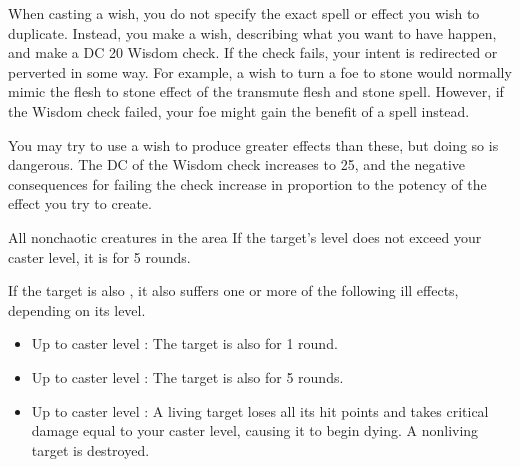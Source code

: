 \par When casting a wish, you do not specify the exact spell or effect you wish to duplicate. Instead, you make a wish, describing what you want to have happen, and make a DC 20 Wisdom check. If the check fails, your intent is redirected or perverted in some way. For example, a wish to turn a foe to stone would normally mimic the flesh to stone effect of the transmute flesh and stone spell. However, if the Wisdom check failed, your foe might gain the benefit of a  spell instead.
\par You may try to use a wish to produce greater effects than these, but doing so is dangerous. The DC of the Wisdom check increases to 25, and the negative consequences for failing the check increase in proportion to the potency of the effect you try to create.

\begin{spellheader}
\end{spellheader}
\begin{spelleffects}
    \begin{spelltargets}{All nonchaotic creatures in the area}
        \spelleffect If the target's level does not exceed your caster level, it is \bewildered for 5 rounds.

        If the target is also \bloodied, it also suffers one or more of the following ill effects, depending on its level.
        \begin{itemize}
            \item Up to caster level : The target is also \confused for 1 round.
            \item Up to caster level : The target is also \paralyzed for 5 rounds.
            \item Up to caster level : A living target loses all its hit points and takes critical damage equal to your caster level, causing it to begin dying. A nonliving target is destroyed.
        \end{itemize}
    \end{spelltargets}
\end{spelleffects}

